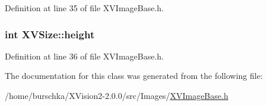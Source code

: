 Definition at line 35 of file XVImage\-Base.h.\label{XVSize_n1}
\hypertarget{class_XVSize_n1}{
\subsubsection[height]{\setlength{\rightskip}{0pt plus 5cm}int XVSize::height}}




Definition at line 36 of file XVImage\-Base.h.

The documentation for this class was generated from the following file:\begin{CompactItemize}
\item 
/home/burschka/XVision2-2.0.0/src/Images/\hyperlink{XVImageBase.h-source}{XVImage\-Base.h}\end{CompactItemize}
